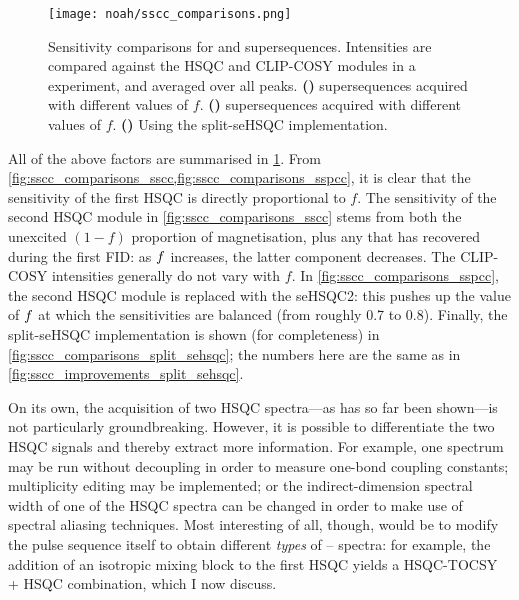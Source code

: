 \begin{figure}[!ht]
    \centering
    \texttt{[image: noah/sscc\_comparisons.png]}%
    {\label{fig:sscc_comparisons_sscc}}%
    {\label{fig:sscc_comparisons_sspcc}}%
    {\label{fig:sscc_comparisons_split_sehsqc}}%
    \caption[Sensitivity comparisons for  and  supersequences]{
        Sensitivity comparisons for  and  supersequences.
        Intensities are compared against the HSQC and CLIP-COSY modules in a  experiment, and averaged over all peaks.
        \textbf{()}  supersequences acquired with different values of $f$.
        \textbf{()}  supersequences acquired with different values of $f$.
        \textbf{()} Using the split-seHSQC implementation.
    }
    \label{fig:sscc_comparisons}
\end{figure}

All of the above factors are summarised in \cref{fig:sscc_comparisons}.
From \cref{fig:sscc_comparisons_sscc,fig:sscc_comparisons_sspcc}, it is clear that the sensitivity of the first HSQC is directly proportional to $f$.
The sensitivity of the second HSQC module in \cref{fig:sscc_comparisons_sscc} stems from both the unexcited $(1 - f)$ proportion of  magnetisation, plus any that has recovered during the first FID: as $f\/$ increases, the latter component decreases.
The CLIP-COSY intensities generally do not vary with $f$.
In \cref{fig:sscc_comparisons_sspcc}, the second HSQC module is replaced with the seHSQC2: this pushes up the value of $f\/$ at which the sensitivities are balanced (from roughly 0.7 to 0.8).
Finally, the split-seHSQC implementation is shown (for completeness) in \cref{fig:sscc_comparisons_split_sehsqc}; the numbers here are the same as in \cref{fig:sscc_improvements_split_sehsqc}.

On its own, the acquisition of two HSQC spectra---as has so far been shown---is not particularly groundbreaking.
However, it is possible to differentiate the two HSQC signals and thereby extract more information.
For example, one spectrum may be run without decoupling in order to measure one-bond coupling constants\autocite{Enthart2008JMR,Nolis2019CPC}; multiplicity editing may be implemented\autocite{SchulzeSunninghausen2017JMR}; or the indirect-dimension spectral width of one of the HSQC spectra can be changed in order to make use of spectral aliasing techniques\autocite{Nolis2019JMR,Jeannerat2011eMR}.
Most interesting of all, though, would be to modify the pulse sequence itself to obtain different \textit{types} of \proton{}--\carbon{} spectra: for example, the addition of an isotropic mixing block to the first HSQC yields a HSQC-TOCSY + HSQC combination\autocite{Nolis2019CPC}, which I now discuss.


